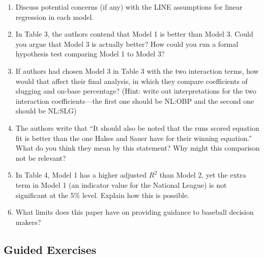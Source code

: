 \documentclass[
]{krantz}
\providecommand{\tightlist}{%
  \setlength{\itemsep}{0pt}\setlength{\parskip}{0pt}}
\begin{document}
\begin{enumerate}
  \begin{enumerate}
  \def\labelenumii{\alph{enumii}.}
  \tightlist
  \item
    Discuss potential concerns (if any) with the LINE assumptions for linear regression in each model.
  \item
    In Table 3, the authors contend that Model 1 is better than Model 3. Could you argue that Model 3 is actually better? How could you run a formal hypothesis test comparing Model 1 to Model 3?
  \item
    If authors had chosen Model 3 in Table 3 with the two interaction terms, how would that affect their final analysis, in which they compare coefficients of slugging and on-base percentage? (Hint: write out interpretations for the two interaction coefficients---the first one should be NL:OBP and the second one should be NL:SLG)
  \item
    The authors write that ``It should also be noted that the runs scored equation fit is better than the one Hakes and Sauer have for their winning equation.'' What do you think they mean by this statement? Why might this comparison not be relevant?
  \item
    In Table 4, Model 1 has a higher adjusted \(R^2\) than Model 2, yet the extra term in Model 1 (an indicator value for the National League) is not significant at the 5\% level. Explain how this is possible.
  \item
    What limits does this paper have on providing guidance to baseball decision makers?
  \end{enumerate}
\end{enumerate}

\hypertarget{guided-exercises}{%
\subsection{Guided Exercises}\label{guided-exercises}}
\end{document}

